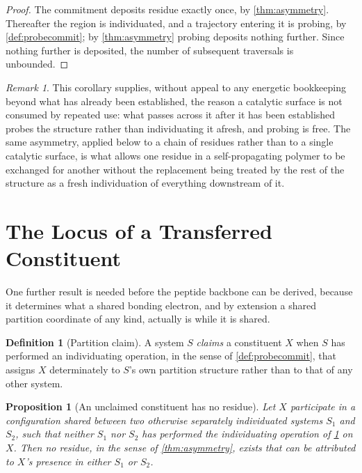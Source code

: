\documentclass[11pt,twocolumn,a4paper]{article}
\theoremstyle{plain}
\newtheorem{proposition}[theorem]{Proposition}
\theoremstyle{definition}
\newtheorem{definition}[theorem]{Definition}
\theoremstyle{remark}
\newtheorem{remark}[theorem]{Remark}
\begin{document}
\begin{proof}
The commitment deposits residue exactly once, by \cref{thm:asymmetry}.
Thereafter the region is individuated, and a trajectory entering it is
probing, by \cref{def:probecommit}; by \cref{thm:asymmetry} probing deposits
nothing further. Since nothing further is deposited, the number of
subsequent traversals is unbounded.
\end{proof}

\begin{remark}
This corollary supplies, without appeal to any energetic bookkeeping beyond
what has already been established, the reason a catalytic surface is not
consumed by repeated use: what passes across it after it has been
established probes the structure rather than individuating it afresh, and
probing is free. The same asymmetry, applied below to a chain of residues
rather than to a single catalytic surface, is what allows one residue in a
self-propagating polymer to be exchanged for another without the
replacement being treated by the rest of the structure as a fresh
individuation of everything downstream of it.
\end{remark}

\section{The Locus of a Transferred Constituent}
\label{sec:noclaim}

One further result is needed before the peptide backbone can be derived,
because it determines what a shared bonding electron, and by extension a
shared partition coordinate of any kind, actually is while it is shared.

\begin{definition}[Partition claim]
\label{def:claim}
A system $S$ \emph{claims} a constituent $X$ when $S$ has performed an
individuating operation, in the sense of \cref{def:probecommit}, that
assigns $X$ determinately to $S$'s own partition structure rather than to
that of any other system.
\end{definition}

\begin{proposition}[An unclaimed constituent has no residue]
\label{prop:unclaimed}
Let $X$ participate in a configuration shared between two otherwise
separately individuated systems $S_1$ and $S_2$, such that neither $S_1$
nor $S_2$ has performed the individuating operation of \cref{def:claim} on
$X$. Then no residue, in the sense of \cref{thm:asymmetry}, exists that can
be attributed to $X$'s presence in either $S_1$ or $S_2$.
\end{proposition}
\end{document}
